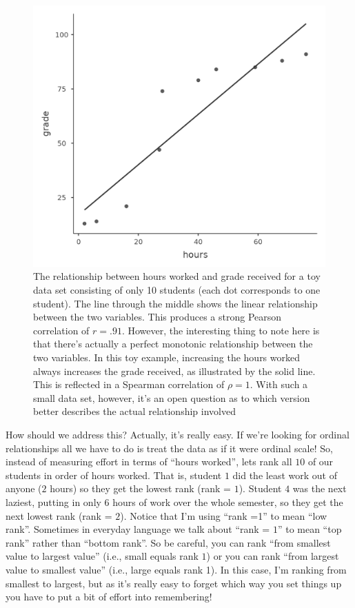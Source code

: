 \documentclass[
  a4paper,
]{book}
\begin{document}
\begin{figure}

\includegraphics[width=1\textwidth,height=\textheight]{images/fig12-7.png} \hfill{}

\caption{\label{fig-fig12-7}The relationship between hours worked and
grade received for a toy data set consisting of only 10 students (each
dot corresponds to one student). The line through the middle shows the
linear relationship between the two variables. This produces a strong
Pearson correlation of \(r = .91\). However, the interesting thing to
note here is that there's actually a perfect monotonic relationship
between the two variables. In this toy example, increasing the hours
worked always increases the grade received, as illustrated by the solid
line. This is reflected in a Spearman correlation of \(\rho = 1\). With
such a small data set, however, it's an open question as to which
version better describes the actual relationship involved}

\end{figure}

How should we address this? Actually, it's really easy. If we're looking
for ordinal relationships all we have to do is treat the data as if it
were ordinal scale! So, instead of measuring effort in terms of ``hours
worked'', lets rank all \(10\) of our students in order of hours worked.
That is, student \(1\) did the least work out of anyone (\(2\) hours) so
they get the lowest rank (rank = \(1\)). Student \(4\) was the next
laziest, putting in only \(6\) hours of work over the whole semester, so
they get the next lowest rank (rank = \(2\)). Notice that I'm using
``rank =1'' to mean ``low rank''. Sometimes in everyday language we talk
about ``rank = \(1\)'' to mean ``top rank'' rather than ``bottom rank''.
So be careful, you can rank ``from smallest value to largest value''
(i.e., small equals rank \(1\)) or you can rank ``from largest value to
smallest value'' (i.e., large equals rank 1). In this case, I'm ranking
from smallest to largest, but as it's really easy to forget which way
you set things up you have to put a bit of effort into remembering!
\end{document}
